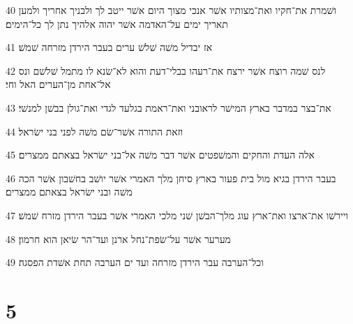 \par 40 ושׁמרת את־חקיו ואת־מצותיו אשׁר אנכי מצוך היום אשׁר ייטב לך ולבניך אחריך ולמען תאריך ימים על־האדמה אשׁר יהוה אלהיך נתן לך כל־הימים׃
\par 41 אז יבדיל משׁה שׁלשׁ ערים בעבר הירדן מזרחה שׁמשׁ׃
\par 42 לנס שׁמה רוצח אשׁר ירצח את־רעהו בבלי־דעת והוא לא־שׂנא לו מתמל שׁלשׁם ונס אל־אחת מן־הערים האל וחי׃
\par 43 את־בצר במדבר בארץ המישׁר לראובני ואת־ראמת בגלעד לגדי ואת־גולן בבשׁן למנשׁי׃
\par 44 וזאת התורה אשׁר־שׂם משׁה לפני בני ישׂראל׃
\par 45 אלה העדת והחקים והמשׁפטים אשׁר דבר משׁה אל־בני ישׂראל בצאתם ממצרים׃
\par 46 בעבר הירדן בגיא מול בית פעור בארץ סיחן מלך האמרי אשׁר יושׁב בחשׁבון אשׁר הכה משׁה ובני ישׂראל בצאתם ממצרים׃
\par 47 ויירשׁו את־ארצו ואת־ארץ עוג מלך־הבשׁן שׁני מלכי האמרי אשׁר בעבר הירדן מזרח שׁמשׁ׃
\par 48 מערער אשׁר על־שׂפת־נחל ארנן ועד־הר שׂיאן הוא חרמון׃
\par 49 וכל־הערבה עבר הירדן מזרחה ועד ים הערבה תחת אשׁדת הפסגה׃

\chapter{5}


